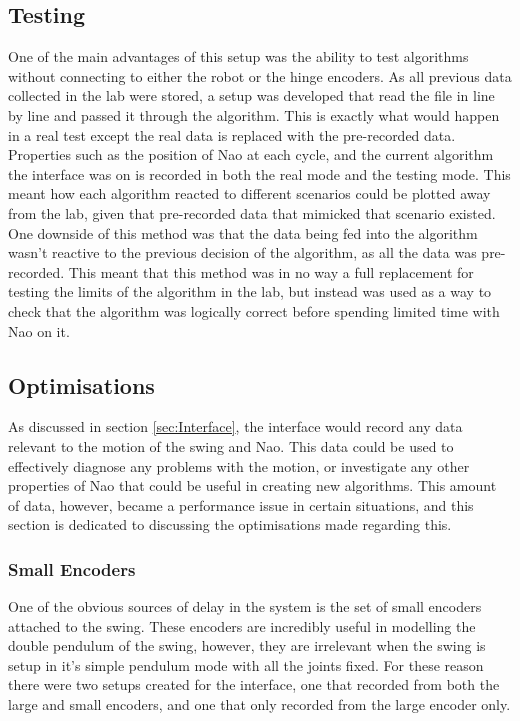 \documentclass[11pt]{article}
\newcommand*\ruleline[1]{\par\noindent\raisebox{.8ex}{\makebox[\linewidth]{\hrulefill\hspace{1ex}\raisebox{-.8ex}{#1}\hspace{1ex}\hrulefill}}}
\begin{document}
\subsection{Testing}
One of the main advantages of this setup was the ability to test algorithms without connecting to either the robot or the hinge encoders. As all previous data collected in the lab were stored, a setup was developed that read the file in line by line and passed it through the algorithm. This is exactly what would happen in a real test except the real data is replaced with the pre-recorded data.\\
Properties such as the position of Nao at each cycle, and the current algorithm the interface was on is recorded in both the real mode and the testing mode. This meant how each algorithm reacted to different scenarios could be plotted away from the lab, given that pre-recorded data that mimicked that scenario existed.\\
One downside of this method was that the data being fed into the algorithm wasn't reactive to the previous decision of the algorithm, as all the data was pre-recorded. This meant that this method was in no way a full replacement for testing the limits of the algorithm in the lab, but instead was used as a way to check that the algorithm was logically correct before spending limited time with Nao on it.

\subsection{Optimisations}
As discussed in section \ref{sec:Interface}, the interface would record any data relevant to the motion of the swing and Nao. This data could be used to effectively diagnose any problems with the motion, or investigate any other properties of Nao that could be useful in creating new algorithms. This amount of data, however, became a performance issue in certain situations, and this section is dedicated to discussing the optimisations made regarding this.

\subsubsection{Small Encoders}
\ruleline{Jonathan Matthews}
One of the obvious sources of delay in the system is the set of small encoders attached to the swing. These encoders are incredibly useful in modelling the double pendulum of the swing, however, they are irrelevant when the swing is setup in it's simple pendulum mode with all the joints fixed. For these reason there were two setups created for the interface, one that recorded from both the large and small encoders, and one that only recorded from the large encoder only.\\
\end{document}
